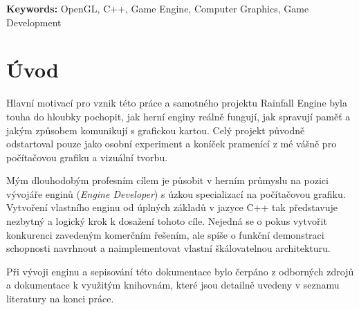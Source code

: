 \documentclass[12pt,a4paper]{article}
\begin{document}
\vspace{1.5cm}


\begin{abstract}
    This thesis focuses on the design and implementation of a game engine centered on 3D computer graphics. The primary objective of the project was to develop a C++ software library for game development alongside a dedicated Windows-based editor that enables real-time visual scene manipulation. The core system utilizes the OpenGL graphics API for efficient rendering and GLSL for shader programming. To manage game objects and data, a modern Entity Component System (ECS) design pattern was implemented, ensuring high flexibility and performance. The final result is a fully functional library and editor, the capabilities of which are demonstrated through a provided sample game. This solution offers a streamlined environment for 3D application development and serves as a practical demonstration of low-level graphics technology implementation.
\end{abstract}
\noindent \textbf{Keywords:} OpenGL, C++, Game Engine, Computer Graphics, Game Development

\newpage



\setcounter{tocdepth}{3}
\tableofcontents
\newpage



\section{Úvod}
Hlavní motivací pro vznik této práce a samotného projektu Rainfall Engine byla touha do hloubky pochopit, jak herní enginy reálně fungují, jak spravují paměť a jakým způsobem komunikují s grafickou kartou. Celý projekt původně odstartoval pouze jako osobní experiment a koníček pramenící z mé vášně pro počítačovou grafiku a vizuální tvorbu.

Mým dlouhodobým profesním cílem je působit v herním průmyslu na pozici vývojáře enginů (\textit{Engine Developer}) s úzkou specializací na počítačovou grafiku. Vytvoření vlastního enginu od úplných základů v jazyce C++ tak představuje nezbytný a logický krok k dosažení tohoto cíle. Nejedná se o pokus vytvořit konkurenci zavedeným komerčním řešením, ale spíše o funkční demonstraci schopnosti navrhnout a naimplementovat vlastní škálovatelnou architekturu.

Při vývoji enginu a sepisování této dokumentace bylo čerpáno z odborných zdrojů a dokumentace k využitým knihovnám, které jsou detailně uvedeny v seznamu literatury na konci práce.
\end{document}
